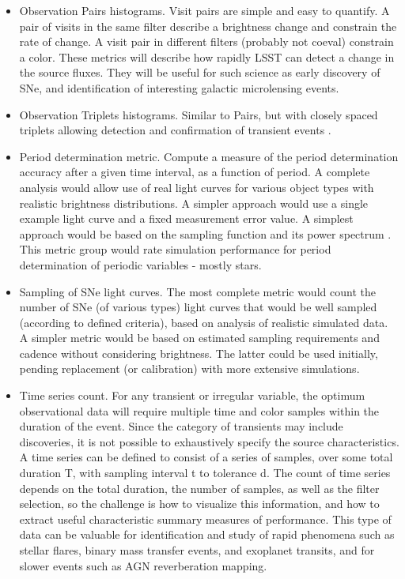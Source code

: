 \begin{itemize}

\item Observation Pairs histograms.  Visit pairs are simple and easy to
quantify.  A pair of visits in the same filter describe a brightness
change and constrain the rate of change. A visit pair in different
filters (probably not coeval) constrain a color.  These metrics will
describe how rapidly LSST can detect a change in the source fluxes. They
will be useful for such science as early discovery of SNe, and
identification of interesting galactic microlensing events.

\item Observation Triplets histograms. Similar to Pairs, but with
closely spaced triplets allowing detection and confirmation of transient
events \citep[as described by][]{LundEtal2016}.

\item Period determination metric.  Compute a measure of the period
determination accuracy after a given time interval, as a function of
period. A complete analysis would allow use of real light curves for
various object types with realistic brightness distributions.  A simpler
approach would use a single example light curve and a fixed measurement
error value. A simplest approach would be based on the sampling function
and its power spectrum \citep{LundEtal2016}.  This metric group would rate
simulation performance for period determination of periodic variables -
mostly stars.

\item Sampling of SNe light curves.  The most complete metric would
count the number of SNe (of various types) light curves that would be
well sampled (according to defined criteria), based on analysis of
realistic simulated data.  A simpler metric would be based on estimated
sampling requirements and cadence without considering brightness. The
latter could be used initially, pending replacement (or calibration)
with more extensive simulations.

\item Time series count. For any transient or irregular variable, the
optimum observational data will require multiple time and color samples
within the duration of the event. Since the category of transients may
include discoveries, it is not possible to exhaustively specify the
source characteristics. A time series can be defined to consist of a
series of samples, over some total duration T, with sampling interval t
to tolerance d. The count of time series depends on the total duration,
the number of samples, as well as the filter selection, so the challenge
is how to visualize this information, and how to extract useful
characteristic summary measures of performance.  This type of data can
be valuable for identification and study of rapid phenomena such as
stellar flares, binary mass transfer events, and exoplanet transits, and
for slower events such as AGN reverberation mapping.

\end{itemize}


